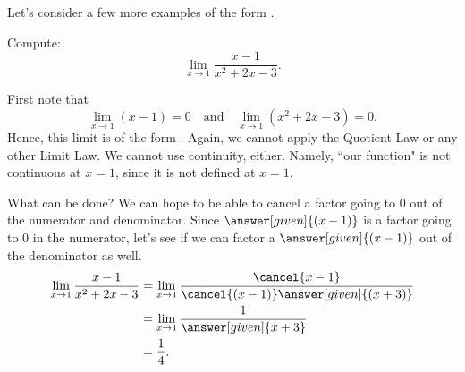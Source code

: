 \documentclass{ximera}
\begin{document}
Let's consider a few more examples of the form \zeroOverZero.

\begin{example}
  Compute:
  \[
  \lim_{x\to1}\frac{x-1}{x^2+2x-3}.
  \]
  \begin{explanation}
    First note that
    \[
    \lim_{x\to1}\left(x-1\right)=0 \quad\text{and}\quad  \lim_{x\to1}\left(x^2+2x-3\right) = 0.
    \]
    Hence, this limit is of the form \zeroOverZero. Again, we cannot apply the Quotient Law or any other Limit Law. We cannot use continuity, either. Namely, ``our function" is not continuous at $x=1$, since it is not defined 
    at $x=1$. 
    
    What can be done? We can hope to be able to  cancel a factor going to $0$ out of the numerator and
    denominator.  Since $\answer[given]{(x-1)}$ is a factor going to $0$ in the
    numerator, let's see if we can factor a $\answer[given]{(x-1)}$ out of the
    denominator as well.
    \begin{align*}
      \lim_{x\to1}\frac{x-1}{x^2+2x-3}&=\lim_{x\to1}\frac{\cancel{x-1}}{\cancel{(x-1)}\answer[given]{(x+3)}} \\
      &=\lim_{x\to1}\frac{1}{\answer[given]{x+3}}\\
      &=\frac{1}{4}.
    \end{align*}
  \end{explanation}
\end{example}
\end{document}
